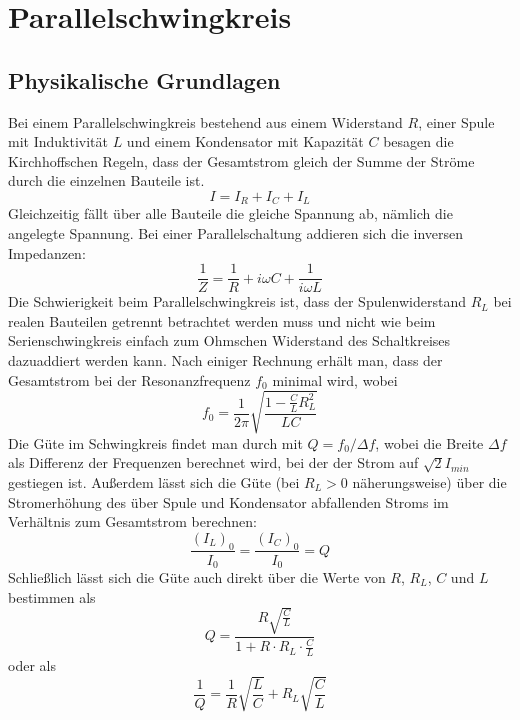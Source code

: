 \documentclass[12pt,a4paper]{article}
\begin{document}
	
\newpage
\section{Parallelschwingkreis}
\subsection{Physikalische Grundlagen}
Bei einem Parallelschwingkreis bestehend aus einem Widerstand $R$, einer Spule mit Induktivität $L$ und einem Kondensator mit Kapazität $C$ besagen die Kirchhoffschen Regeln, dass der Gesamtstrom gleich der Summe der Ströme durch die einzelnen Bauteile ist.
\begin{equation}
I=I_R+I_C+I_L
\end{equation}
Gleichzeitig fällt über alle Bauteile die gleiche Spannung ab, nämlich die angelegte Spannung. Bei einer Parallelschaltung addieren sich die inversen Impedanzen:
\begin{equation}
\frac{1}{Z}=\frac{1}{R}+i\omega C+\frac{1}{i\omega L}
\end{equation}
Die Schwierigkeit beim Parallelschwingkreis ist, dass der Spulenwiderstand $R_L$ bei realen Bauteilen getrennt betrachtet werden muss und nicht wie beim Serienschwingkreis einfach zum Ohmschen Widerstand des Schaltkreises dazuaddiert werden kann. Nach einiger Rechnung erhält man, dass der Gesamtstrom bei der Resonanzfrequenz $f_0$ minimal wird, wobei
\begin{equation}
f_0=\frac{1}{2\pi}\sqrt{\frac{1-\frac{C}{L}R_L^2}{LC}}
\end{equation}
Die Güte im Schwingkreis findet man durch mit $Q=f_0/\Delta f$, wobei die Breite $\Delta f$ als Differenz der Frequenzen berechnet wird, bei der der Strom auf $\sqrt{2}I_{min}$ gestiegen ist. Außerdem lässt sich die Güte (bei $R_L>0$ näherungsweise) über die Stromerhöhung des über Spule und Kondensator abfallenden Stroms im Verhältnis zum Gesamtstrom berechnen:
\begin{equation}
\frac{(I_L)_0}{I_0}=\frac{(I_C)_0}{I_0}=Q
\end{equation}  
Schließlich lässt sich die Güte auch direkt über die Werte von $R$, $R_L$, $C$ und $L$ bestimmen als 
\begin{equation}\label{eq:guete_parallelschaltkreis}
Q=\frac{R\sqrt{\frac{C}{L}}}{1+R\cdot R_L\cdot \frac{C}{L}}
\end{equation}
oder als
\begin{equation}
	\frac{1}{Q}=\frac{1}{R}\sqrt{\frac{L}{C}}+R_L\sqrt{\frac{C}{L}}
\end{equation}
\end{document}
